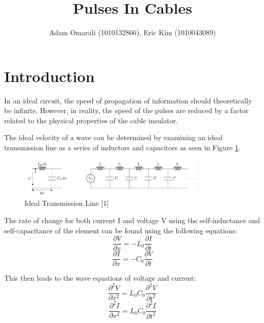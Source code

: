 \documentclass[12pt]{article}
\begin{document}
\vspace{-5cm}
\title{\bf{Pulses In Cables}}
\author{Adam Omarali (1010132866), Eric Kim (1010043089)}
\maketitle

\section{Introduction}
In an ideal circuit, the speed of propagation of information should theoretically be infinite. However, in reality, the speed of the pulses are reduced by a factor related to the physical properties of the cable insulator. 	

The ideal velocity of a wave can be determined by examining an ideal transmission line as a series of inductors and capacitors as seen in Figure \ref{fig:ideal_transmission_line}.
\begin{figure}[h]
    \centering
    \includegraphics[width=0.8\textwidth]{img/ideal_line.png}
    \caption{Ideal Transmission Line [1]}
    \label{fig:ideal_transmission_line}
\end{figure}

The rate of change for both current I and voltage V using the self-inductance and self-capacitance of the element can be found using the following equations:
\begin{equation}
    \frac{\partial V}{\partial x} = -L_0 \frac{\partial I}{\partial t} 
\end{equation}
\begin{equation}
    \frac{\partial I}{\partial x} = -C_0 \frac{\partial V}{\partial t}
\end{equation}

This then leads to the wave equations of voltage and current:
\begin{equation}
    \frac{\partial^2 V}{\partial x^2} = L_0 C_0 \frac{\partial^2 V}{\partial t^2}
\end{equation}
\begin{equation}
    \frac{\partial^2 I}{\partial x^2} = L_0 C_0 \frac{\partial^2 I}{\partial t^2}
\end{equation}
\end{document}

